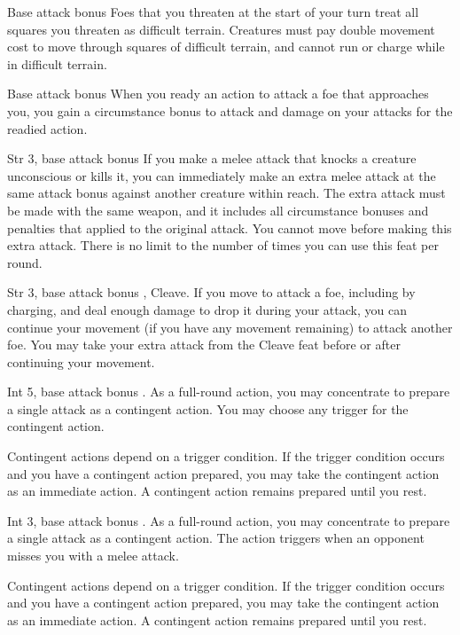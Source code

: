  Base attack bonus 
 Foes that you threaten at the start of your turn treat all squares you threaten as difficult terrain. Creatures must pay double movement cost to move through squares of difficult terrain, and cannot run or charge while in difficult terrain.

 Base attack bonus 
 When you ready an action to attack a foe that approaches you, you gain a  circumstance bonus to attack and damage on your attacks for the readied action.

 Str 3, base attack bonus 
 If you make a melee attack that knocks a creature unconscious or kills it, you can immediately make an extra melee attack at the same attack bonus against another creature within reach. The extra attack must be made with the same weapon, and it includes all circumstance bonuses and penalties that applied to the original attack. You cannot move before making this extra attack. There is no limit to the number of times you can use this feat per round.

 Str 3, base attack bonus , Cleave.
 If you move to attack a foe, including by charging, and deal enough damage to drop it during your attack, you can continue your movement (if you have any movement remaining) to attack another foe. You may take your extra attack from the Cleave feat before or after continuing your movement.

\featpre Int 5, base attack bonus .
\featben As a full-round action, you may concentrate to prepare a single attack as a contingent action. You may choose any trigger for the contingent action.

Contingent actions depend on a trigger condition. If the trigger condition occurs and you have a contingent action prepared, you may take the contingent action as an immediate action. A contingent action remains prepared until you rest.

\featpre Int 3, base attack bonus .
\featben As a full-round action, you may concentrate to prepare a single attack as a contingent action. The action triggers when an opponent misses you with a melee attack.

Contingent actions depend on a trigger condition. If the trigger condition occurs and you have a contingent action prepared, you may take the contingent action as an immediate action. A contingent action remains prepared until you rest.

